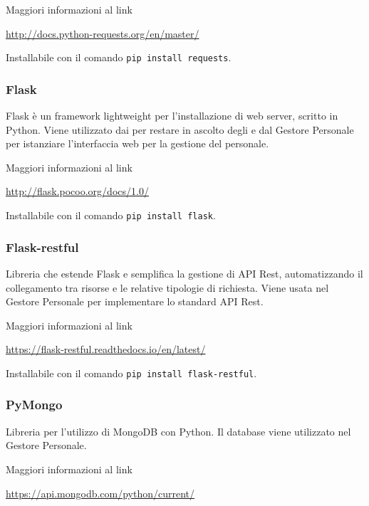 Maggiori informazioni al link

\begin{center}
    \url{http://docs.python-requests.org/en/master/}
\end{center}

Installabile con il comando \texttt{pip install requests}.

\subsubsection{Flask}
Flask è un framework lightweight per l'installazione di web server, scritto in Python.
Viene utilizzato dai  per restare in ascolto degli  e dal Gestore Personale per istanziare l'interfaccia
web per la gestione del personale.

Maggiori informazioni al link

\begin{center}
    \url{http://flask.pocoo.org/docs/1.0/}
\end{center}

Installabile con il comando \texttt{pip install flask}.

\subsubsection{Flask-restful}
Libreria che estende Flask e semplifica la gestione di API Rest, automatizzando il collegamento tra risorse e le relative tipologie di richiesta.
Viene usata nel Gestore Personale per implementare lo standard API Rest.

Maggiori informazioni al link

\begin{center}
    \url{https://flask-restful.readthedocs.io/en/latest/}
\end{center}

Installabile con il comando \texttt{pip install flask-restful}.

\subsubsection{PyMongo}

Libreria per l'utilizzo di MongoDB con Python. Il database viene utilizzato nel Gestore Personale.

Maggiori informazioni al link

\begin{center}
    \url{https://api.mongodb.com/python/current/}
\end{center}

